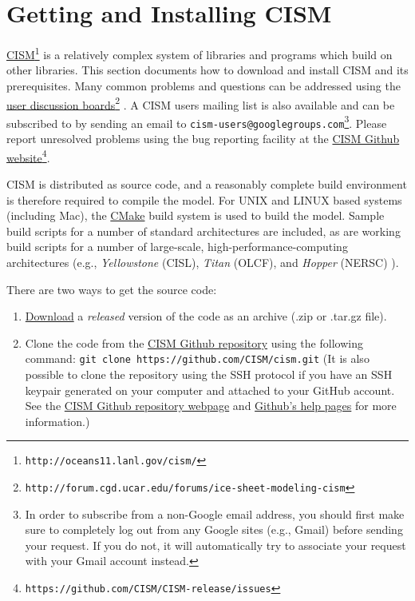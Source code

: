 
\section{Getting and Installing CISM}
\label{sec:getcode}

\href{http://oceans11.lanl.gov/cism/}{CISM}\footnote{\texttt{http://oceans11.lanl.gov/cism/}} 
is a relatively complex system of libraries and programs which build on other libraries. 
This section documents how to download and install CISM and its prerequisites.
Many common problems and questions can be addressed using the 
\href{http://forum.cgd.ucar.edu/forums/ice-sheet-modeling-cism}{user discussion boards}\footnote{\texttt{http://forum.cgd.ucar.edu/forums/ice-sheet-modeling-cism}}
. 
A CISM users mailing list is also available and can be subscribed to by sending an email
to \texttt{cism-users@googlegroups.com}\footnote{In order to subscribe from a non-Google email
address, you should first make sure to completely log out from any Google sites (e.g., Gmail) before sending 
your request. If you do not, it will automatically try to associate your request with your Gmail account instead.}.
Please report unresolved problems using the bug reporting facility at the 
\href{https://github.com/CISM/CISM-release/issues}{CISM Github website}\footnote{\texttt{https://github.com/CISM/CISM-release/issues}}. 

CISM is distributed as source code, and a reasonably complete build environment is therefore required to compile the model. 
For UNIX and LINUX based systems (including Mac), the \href{http://www.cmake.org/}{CMake} build system is used to build the model. 
Sample build scripts for a number of standard architectures are included, as are working build scripts 
for a number of large-scale, high-performance-computing architectures 
(e.g., \textit{Yellowstone} (CISL), \textit{Titan} (OLCF), and \textit{Hopper} (NERSC) ). 

There are two ways to get the source code:

\begin{enumerate}

\item \href{https://github.com/CISM/cism/releases}{Download} a {\it released} version of the code as an archive (.zip or .tar.gz file).
\item Clone the code from the \href{https://github.com/CISM/cism}{CISM Github repository} using the following command: 
\texttt{git clone https://github.com/CISM/cism.git}
(It is also possible to clone the repository using the SSH protocol 
if you have an SSH keypair generated on your computer and attached to your GitHub account.  
See the \href{https://github.com/CISM/cism}{CISM Github repository webpage} and 
\href{https://help.github.com/articles/which-remote-url-should-i-use}{Github's help pages} for more information.)

\end{enumerate}

